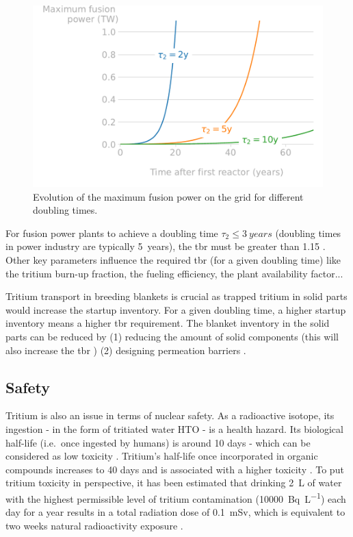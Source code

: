 \begin{figure}
    \centering
    \includegraphics[width=0.8\linewidth]{Figures/Chapter1/doubling_time.pdf}
    \caption{Evolution of the maximum fusion power on the grid for different doubling times.}
\end{figure}

For fusion power plants to achieve a doubling time $\tau_2 \leq \SI{3}{years}$ (doubling times in power industry are typically \SI{5}{years}), the \gls{tbr} must be greater than 1.15 .
Other key parameters influence the required \gls{tbr} (for a given doubling time) like the tritium burn-up fraction, the fueling efficiency, the plant availability factor...

Tritium transport in \glspl{breeding blanket} is crucial as trapped tritium in solid parts would increase the \gls{startup inventory}.
For a given doubling time, a higher \gls{startup inventory} means a higher \gls{tbr} requirement.
The blanket \gls{inventory} in the solid parts can be reduced by (1) reducing the amount of solid components (this will also increase the \gls{tbr} \cite{shimwell_multiphysics_2019}) (2) designing permeation barriers .

\subsection{Safety}
Tritium is also an issue in terms of nuclear safety.
As a radioactive \gls{isotope}, its ingestion - in the form of tritiated water HTO - is a health hazard.
Its biological half-life (i.e.\ once ingested by humans) is around 10 days - which can be considered as low toxicity .
Tritium's half-life once incorporated in organic compounds increases to 40 days and is associated with a higher toxicity \cite{bridges_review_2007}.
To put tritium toxicity in perspective, it has been estimated that drinking \SI{2}{L} of water with the highest permissible level of tritium contamination (\SI{10000}{Bq.L^{-1}}) each day for a year results in a total radiation dose of \SI{0.1}{mSv}, which is equivalent to two weeks natural radioactivity exposure .


